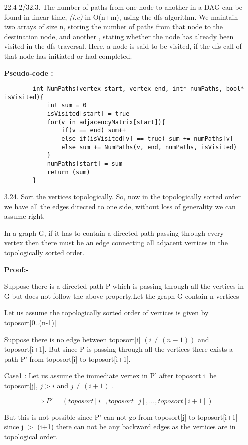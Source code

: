 \documentclass[12pt]{article}
\begin{document}
\begin{enumerate}
    \item[22.4-2/32.3.] The number of paths from one node to another in a DAG can be found in linear time, \textit{(i.e)} in O(n+m), using the dfs algorithm. We maintain two arrays of size n, storing the number of paths from that node to the destination node, and another , stating whether the node has already been visited in the dfs traversal. Here, a node is said to be visited, if the dfs call of that node has initiated or had completed.
    
    \textbf{Pseudo-code :}
    \begin{verbatim}
        int NumPaths(vertex start, vertex end, int* numPaths, bool* isVisited){
            int sum = 0
            isVisited[start] = true
            for(v in adjacencyMatrix[start]){
                if(v == end) sum++
                else if(isVisited[v] == true) sum += numPaths[v]
                else sum += NumPaths(v, end, numPaths, isVisited)
            }
            numPaths[start] = sum
            return (sum)
        }
    \end{verbatim}
    \item[3.24.] Sort the vertices topologically. So, now in the topologically sorted order we have all the edges directed to one side, without loss of generality we can assume right. 
    
    In a graph G, if it has to contain a directed path passing through every vertex then there must be an edge connecting all adjacent vertices in the topologically sorted order.
    
    \textbf{Proof:-}
    
    Suppose there is a directed path P which is passing through all the vertices in G but does not follow the above property.Let the graph G contain n vertices 
    
    Let us assume the topologically sorted order of vertices is given by toposort[0..(n-1)]
    
    Suppose there is no edge between toposort[i] $(i\neq(n-1))$ and toposort[i+1]. But since P is passing through all the vertices there exists a path P' from toposort[i] to toposort[i+1]. 
    
    \underline{Case1 }:
    Let us assume the immediate vertex in P' after toposort[i] be toposort[j], $j>i$ and $j\neq(i+1)$ . 
    
    \[ \Rightarrow P' = ( toposort[i],toposort[j],...,toposort[i+1] )  \]
    
    But this is not possible since P' can not go from toposort[j] to toposort[i+1] since j $>$ (i+1) there can not be any backward edges as the vertices are in topological order.
    

\end{enumerate}
\end{document}
